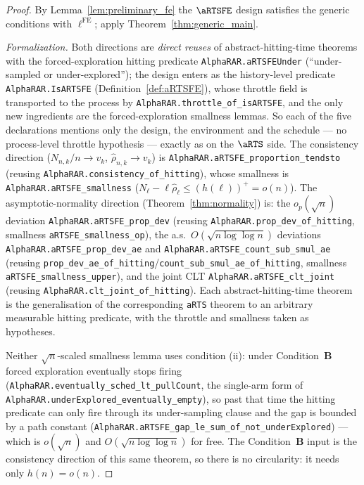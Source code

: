 \begin{proof}
By Lemma~\ref{lem:preliminary_fe} the $\aRTSFE$ design satisfies the generic
conditions with $\ell^{\mathrm{FE}}$; apply Theorem~\ref{thm:generic_main}.

\emph{Formalization.} Both directions are \emph{direct reuses} of abstract-hitting-time theorems
with the forced-exploration hitting predicate \texttt{AlphaRAR.aRTSFEUnder}
(``under-sampled or under-explored''); the design enters as the history-level predicate
\texttt{AlphaRAR.IsARTSFE} (Definition~\ref{def:aRTSFE}), whose throttle field is transported to
the process by \texttt{AlphaRAR.throttle\_of\_isARTSFE}, and the only new ingredients are the
forced-exploration smallness lemmas. So each of the five declarations mentions only the design, the
environment and the schedule --- no process-level throttle hypothesis --- exactly as on the
$\aRTS$ side. The consistency direction
($N_{n,k}/n\to v_k$, $\hat\rho_{n,k}\to v_k$) is \texttt{AlphaRAR.aRTSFE\_proportion\_tendsto}
(reusing \texttt{AlphaRAR.consistency\_of\_hitting}), whose smallness is
\texttt{AlphaRAR.aRTSFE\_smallness} ($N_\ell-\ell\hat\rho_\ell\le(h(\ell))^+=o(n)$). The
asymptotic-normality direction (Theorem~\ref{thm:normality}) is: the $o_p(\sqrt n)$ deviation
\texttt{AlphaRAR.aRTSFE\_prop\_dev} (reusing \texttt{AlphaRAR.prop\_dev\_of\_hitting}, smallness
\texttt{aRTSFE\_smallness\_op}), the a.s.\ $O(\sqrt{n\log\log n})$ deviations
\texttt{AlphaRAR.aRTSFE\_prop\_dev\_ae} and \texttt{AlphaRAR.aRTSFE\_count\_sub\_smul\_ae} (reusing
\texttt{prop\_dev\_ae\_of\_hitting}/\texttt{count\_sub\_smul\_ae\_of\_hitting}, smallness
\texttt{aRTSFE\_smallness\_upper}), and the joint CLT \texttt{AlphaRAR.aRTSFE\_clt\_joint} (reusing
\texttt{AlphaRAR.clt\_joint\_of\_hitting}). Each abstract-hitting-time theorem is the generalisation
of the corresponding \texttt{aRTS} theorem to an arbitrary measurable hitting predicate, with the
throttle and smallness taken as hypotheses.

Neither $\sqrt n$-scaled smallness lemma uses condition (ii): under Condition~\textbf{B} forced
exploration eventually stops firing (\texttt{AlphaRAR.eventually\_sched\_lt\_pullCount}, the single-arm
form of \texttt{AlphaRAR.underExplored\_eventually\_empty}), so past that time the hitting predicate
can only fire through its under-sampling clause and the gap is bounded by a path constant
(\texttt{AlphaRAR.aRTSFE\_gap\_le\_sum\_of\_not\_underExplored}) --- which is $o(\sqrt n)$ and
$O(\sqrt{n\log\log n})$ for free. The Condition~\textbf{B} input is the consistency direction of
this same theorem, so there is no circularity: it needs only $h(n)=o(n)$.
\end{proof}

